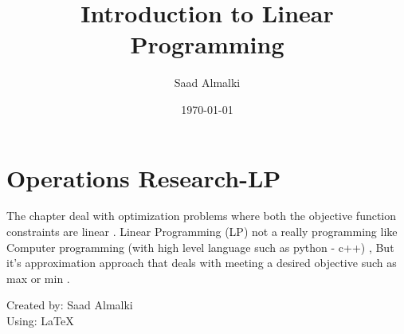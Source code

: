 \documentclass[12pt]{article}
\title{Introduction to Linear Programming}
\author{Saad Almalki}
\date{\today}
\begin{document}
\maketitle

\section{Operations Research-LP}

The chapter deal with optimization problems where both the objective function constraints are linear . Linear Programming (LP) not a really programming like Computer programming (with high level
language such as python - c++) , But it's approximation approach that deals with meeting a desired objective such as max or min .

\begin{flushright}
Created by: Saad Almalki \\
Using: \LaTeX
\end{flushright}
\end{document}
